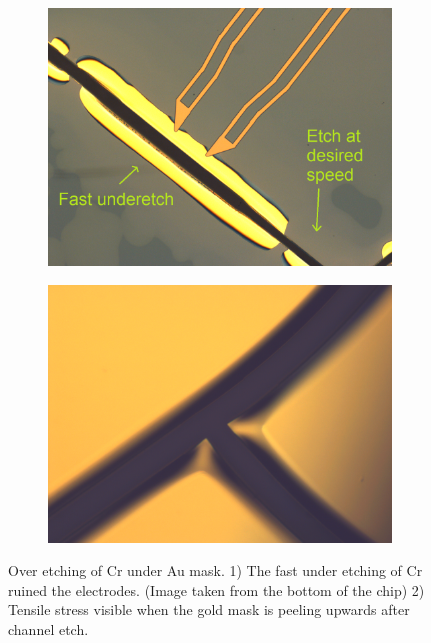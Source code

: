 \documentclass[final]{jyflluk}
\begin{document}
\begin{figure}[h]
    \centering
    \begin{subfigure}{0.48\textwidth}
        \centering
        \includegraphics[width=\linewidth]{optical/underetch01.png} 
        \caption{} \label{fig:lileee}
    \end{subfigure}
    \hfill
    \begin{subfigure}{0.48\textwidth}
        \centering
        \includegraphics[width=\linewidth]{optical/tensilestress.png} 
        \caption{} \label{fig:lellqqq}
    \end{subfigure}
    \caption{Over etching of Cr under Au mask. 1) The fast under etching of Cr ruined the electrodes. (Image taken from the bottom of the chip) 2) Tensile stress visible when the gold mask is peeling upwards after channel etch.} \label{fig:underetch}
\end{figure}  
\end{document}
